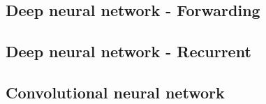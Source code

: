 \subsection{Deep neural network - Forwarding}
\subsection{Deep neural network - Recurrent}
\subsection{Convolutional neural network}

